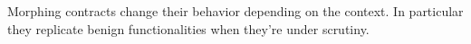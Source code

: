 Morphing contracts change their behavior depending on the context.
In particular they replicate benign functionalities when they're under scrutiny.
